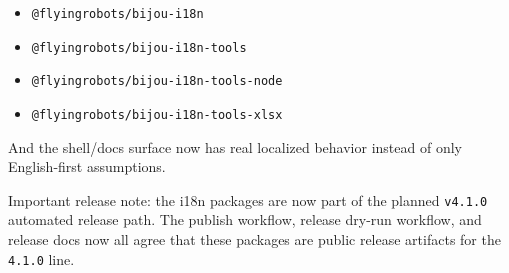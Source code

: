 \begin{itemize}
\tightlist
\item
  \texttt{@\allowbreak{}f\allowbreak{}l\allowbreak{}y\allowbreak{}i\allowbreak{}n\allowbreak{}g\allowbreak{}r\allowbreak{}o\allowbreak{}b\allowbreak{}o\allowbreak{}t\allowbreak{}s\allowbreak{}/\allowbreak{}b\allowbreak{}i\allowbreak{}j\allowbreak{}o\allowbreak{}u\allowbreak{}-\allowbreak{}i\allowbreak{}1\allowbreak{}8\allowbreak{}n}
\item
  \texttt{@\allowbreak{}f\allowbreak{}l\allowbreak{}y\allowbreak{}i\allowbreak{}n\allowbreak{}g\allowbreak{}r\allowbreak{}o\allowbreak{}b\allowbreak{}o\allowbreak{}t\allowbreak{}s\allowbreak{}/\allowbreak{}b\allowbreak{}i\allowbreak{}j\allowbreak{}o\allowbreak{}u\allowbreak{}-\allowbreak{}i\allowbreak{}1\allowbreak{}8\allowbreak{}n\allowbreak{}-\allowbreak{}t\allowbreak{}o\allowbreak{}o\allowbreak{}l\allowbreak{}s}
\item
  \texttt{@\allowbreak{}f\allowbreak{}l\allowbreak{}y\allowbreak{}i\allowbreak{}n\allowbreak{}g\allowbreak{}r\allowbreak{}o\allowbreak{}b\allowbreak{}o\allowbreak{}t\allowbreak{}s\allowbreak{}/\allowbreak{}b\allowbreak{}i\allowbreak{}j\allowbreak{}o\allowbreak{}u\allowbreak{}-\allowbreak{}i\allowbreak{}1\allowbreak{}8\allowbreak{}n\allowbreak{}-\allowbreak{}t\allowbreak{}o\allowbreak{}o\allowbreak{}l\allowbreak{}s\allowbreak{}-\allowbreak{}n\allowbreak{}o\allowbreak{}d\allowbreak{}e}
\item
  \texttt{@\allowbreak{}f\allowbreak{}l\allowbreak{}y\allowbreak{}i\allowbreak{}n\allowbreak{}g\allowbreak{}r\allowbreak{}o\allowbreak{}b\allowbreak{}o\allowbreak{}t\allowbreak{}s\allowbreak{}/\allowbreak{}b\allowbreak{}i\allowbreak{}j\allowbreak{}o\allowbreak{}u\allowbreak{}-\allowbreak{}i\allowbreak{}1\allowbreak{}8\allowbreak{}n\allowbreak{}-\allowbreak{}t\allowbreak{}o\allowbreak{}o\allowbreak{}l\allowbreak{}s\allowbreak{}-\allowbreak{}x\allowbreak{}l\allowbreak{}s\allowbreak{}x}
\end{itemize}

And the shell/docs surface now has real localized behavior instead of only English-first assumptions.

Important release note: the i18n packages are now part of the planned \texttt{v\allowbreak{}4\allowbreak{}.\allowbreak{}1\allowbreak{}.\allowbreak{}0} automated release path. The publish workflow, release dry-run workflow, and release docs now all agree that these packages are public release artifacts for the \texttt{4\allowbreak{}.\allowbreak{}1\allowbreak{}.\allowbreak{}0} line.


